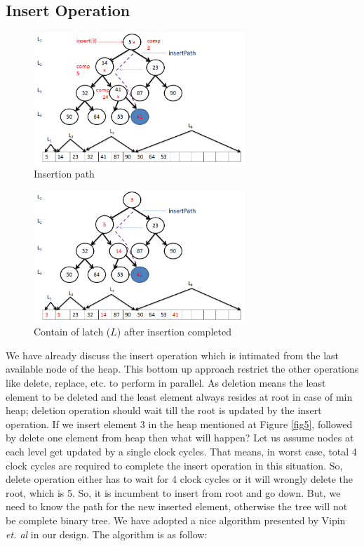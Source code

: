 \documentclass[10pt, conference, compsocconf]{IEEEtran}
\begin{document}
\subsection{Insert Operation}
\begin{figure}[h]
  \centering
  \includegraphics[width=8cm]{Figures/6.png}
      \caption{Insertion path}
    \label{fig6}
\end{figure}

\begin{figure}[h]
  \centering
  \includegraphics[width=8cm]{Figures/7.png}
      \caption{Contain of latch ($L$) after insertion completed}
    \label{fig7}
\end{figure}

We have already discuss the insert operation which is intimated from the last available node of the heap. This bottom up approach restrict the other operations like delete, replace, etc. to perform in parallel. As deletion means the least element to be deleted and the least element always resides at root in case of min heap; deletion operation should wait till the root is updated by the insert operation. If we insert element 3 in the heap mentioned at Figure \ref{fig5}, followed by delete one element from heap then what will happen? Let us assume nodes at each level get updated by a single clock cycles. That means, in worst case, total 4 clock cycles are required to complete the insert operation in this situation. So, delete operation either has to wait for 4 clock cycles or it will wrongly delete the root, which is 5. So, it is incumbent to insert from root and go down. But, we need to know the path for the new inserted element, otherwise the tree will not be complete binary tree. We have adopted a nice algorithm presented by Vipin {\it et. al} \cite{pq6} in our design. The algorithm is as follow:
\end{document}
